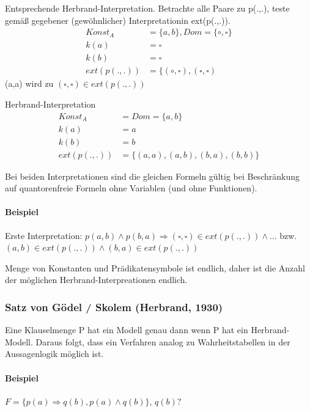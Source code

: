 \documentclass[12pt, a4paper]{article}
\begin{document}
Entsprechende Herbrand-Interpretation. Betrachte alle Paare zu p(.,.), teste gemäß gegebener (gewöhnlicher) Interpretationin ext(p(.,.)).
\begin{equation}
\begin{split}
Konst_A &= \{ a,b \}, Dom = \{ \circ, \square \} \\
k(a) &= \square\\
k(b) &= \square \\
ext(p(.,.)) &=  \{ (\circ, \square), (\square, \square) 
\end{split}
\end{equation}
(a,a) wird zu $(\square, \square) \in ext(p(.,.))$

Herbrand-Interpretation
\begin{equation}
\begin{split}
Konst_A &= Dom = \{ a,b \} \\
k(a) &= a\\
k(b) &= b \\
ext(p(.,.)) &=  \{ (a,a), (a, b), (b,a), (b,b) \}
\end{split}
\end{equation}

Bei beiden Interpretationen sind die gleichen Formeln gültig bei Beschränkung auf quantorenfreie Formeln ohne Variablen (und ohne Funktionen).

\paragraph*{Beispiel}

Erste Interpretation: $p(a,b) \wedge p(b,a) \Rightarrow (\square, \square) \in ext(p(.,.)) \wedge ...$ bzw. $(a,b) \in ext(p(.,.)) \wedge (b,a) \in ext(p(.,.))$

Menge von Konstanten und Prädikatensymbole ist endlich, daher ist die Anzahl der möglichen Herbrand-Interpreationen endlich.

\subsubsection*{Satz von Gödel / Skolem (Herbrand, 1930)}
Eine Klauselmenge P hat ein Modell genau dann wenn P hat ein Herbrand-Modell.
Daraus folgt, dass ein Verfahren analog zu Wahrheitstabellen in der Aussagenlogik möglich ist.

\paragraph*{Beispiel}
$F = \{ p(a) \Rightarrow q(b), p(a) \wedge q(b) \}$, $q(b)?$
\end{document}
